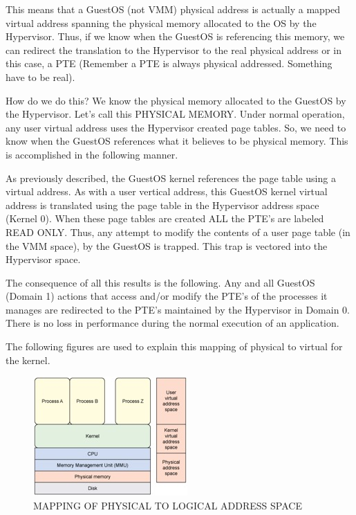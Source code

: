 \documentclass{article}
\begin{document}
This means that a GuestOS (not VMM) physical address is actually a mapped virtual address spanning the physical memory allocated to the OS by the Hypervisor.  Thus, if we know when the GuestOS is referencing this memory,  we can redirect the translation  to the Hypervisor  to the real physical address or in this case, a PTE (Remember a PTE is always physical addressed.  Something have to be real).  

How do we do this?  We know the physical memory allocated to the GuestOS by the Hypervisor.  Let’s call this PHYSICAL MEMORY.   Under normal operation,  any user virtual address uses the Hypervisor created page tables.  So, we need to know when the GuestOS  references what it believes to be physical memory.   This is  accomplished in the following manner. 

As previously described,  the GuestOS kernel references the page table using a virtual address.  As with a user vertical address,  this GuestOS kernel virtual address is translated using the page table in the Hypervisor address space (Kernel 0).  When these page tables are created ALL the PTE’s are labeled READ ONLY.  Thus, any attempt to modify the contents of a user page table (in the VMM space),  by the GuestOS is trapped.  This trap is vectored into the Hypervisor space.

The consequence of all this results is the following.  Any and all GuestOS (Domain 1) actions that access and/or modify the PTE’s of the processes it manages are redirected to the PTE’s maintained by the Hypervisor in Domain 0.  There is no loss in performance during the normal execution of an application.

The following figures are used to explain this mapping of physical to virtual for the kernel.

\begin{figure}
\begin{center}
\includegraphics [scale = .5]
{figures/figure9mapping_logical_physical.jpg}
\caption{MAPPING OF PHYSICAL TO LOGICAL ADDRESS SPACE}
\end{center}
\end{figure}
\end{document}
